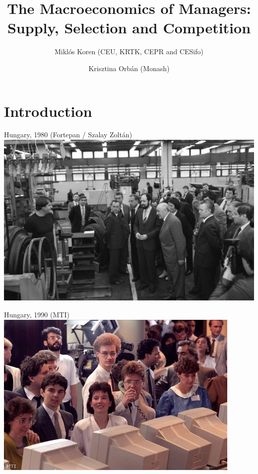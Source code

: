 \documentclass[
  ignorenonframetext,
  aspectratio=1610,
]{beamer}
\title{The Macroeconomics of Managers: Supply, Selection and
Competition}
\author{Miklós Koren (CEU, KRTK, CEPR and CESifo) \and Krisztina Orbán
(Monash)}
\date{December 14, 2023\footnote<.->{Supported by Forefront Research
  Excellence Grant (144193) and ERC Advanced Grant (101097789)}}
\let\oldsection\section
\renewcommand{\section}{
  \addtocounter{framenumber}{-1} %
  \oldsection
}
\begin{document}
\frame{\titlepage}

\section{Introduction}\label{introduction}

\begin{frame}{Hungary, 1980 (Fortepan / Szalay Zoltán)}
\protect\hypertarget{hungary-1980-fortepan-szalay-zoltuxe1n}{}
\includegraphics{fig/fortepan_198036.jpg}
\end{frame}

\begin{frame}{Hungary, 1990 (MTI)}
\protect\hypertarget{hungary-1990-mti}{}
\includegraphics{fig/tozsde.jpg}
\end{frame}
\end{document}
